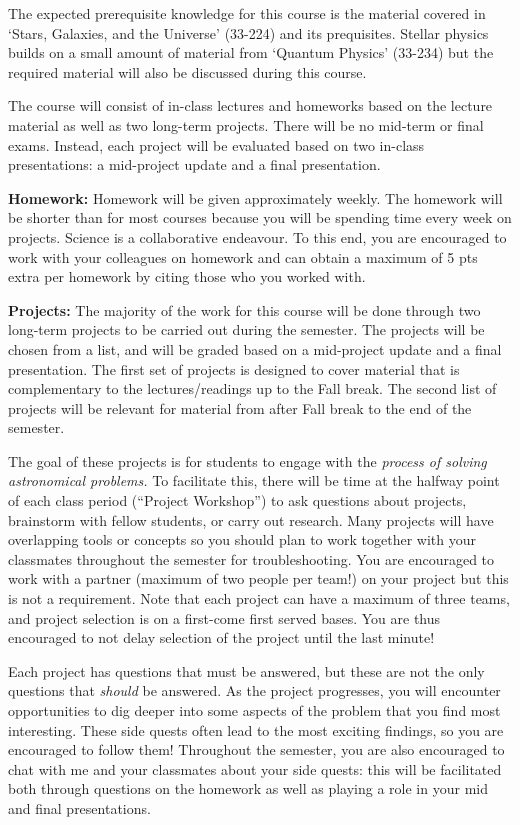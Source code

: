 \documentclass[11pt, a4paper]{article}
\begin{document}
\noindent The expected prerequisite knowledge for this course is the material
covered in `Stars, Galaxies, and the Universe' (33-224) and its prequisites.
Stellar physics builds on a small amount of material from `Quantum Physics'
(33-234) but the required material will also be discussed during this course. 


\label{sec:eval-procudures}
\noindent The course will consist of in-class lectures and homeworks based on
the lecture material as well as two long-term projects. There will be no
mid-term or final exams. Instead, each project will be evaluated based on two
in-class presentations: a mid-project update and a final presentation. 

\textbf{Homework:} Homework will be given approximately weekly. The homework
will be shorter than for most courses because you will be spending time every
week on projects. Science is a collaborative endeavour. To this end, you are
encouraged to work with your colleagues on homework and can obtain a maximum of
5 pts extra per homework by citing those who you worked with. 

\textbf{Projects:} The majority of the work for this course will be done through
two long-term projects to be carried out during the semester. The projects will
be chosen from a list, and will be graded based on a mid-project update and a
final presentation. The first set of projects is designed to cover material that
is complementary to the lectures/readings up to the Fall break. The second list
of projects will be relevant for material from after Fall break to the end of
the semester.

The goal of these projects is for students to engage with the \emph{process of
solving astronomical problems.}  To facilitate this, there will be time at the
halfway point of each class period (``Project Workshop'') to ask questions about
projects, brainstorm with fellow students, or carry out research. Many projects
will have overlapping tools or concepts so you should plan to work together with
your classmates throughout the semester for troubleshooting. You are encouraged
to work with a partner (maximum of two people per team!) on your project but
this is not a requirement. Note that each project can have a maximum of three
teams, and project selection is on a first-come first served bases. You are thus
encouraged to not delay selection of the project until the last minute!


Each project has questions that must be answered, but these are not the only
questions that \emph{should} be answered. As the project progresses, you will
encounter opportunities to dig deeper into some aspects of the problem that you
find most interesting. These side quests often lead to the most exciting
findings, so you are encouraged to follow them! Throughout the semester, you are
also encouraged to chat with me and your classmates about your side quests: this
will be facilitated both through questions on the homework as well as playing a
role in your mid and final presentations.
\end{document}
